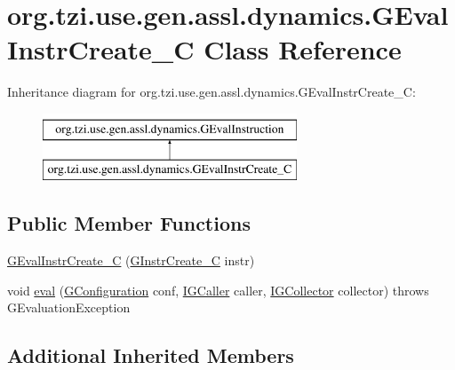\hypertarget{classorg_1_1tzi_1_1use_1_1gen_1_1assl_1_1dynamics_1_1_g_eval_instr_create___c}{\section{org.\-tzi.\-use.\-gen.\-assl.\-dynamics.\-G\-Eval\-Instr\-Create\-\_\-\-C Class Reference}
\label{classorg_1_1tzi_1_1use_1_1gen_1_1assl_1_1dynamics_1_1_g_eval_instr_create___c}
}
Inheritance diagram for org.\-tzi.\-use.\-gen.\-assl.\-dynamics.\-G\-Eval\-Instr\-Create\-\_\-\-C\-:\begin{figure}[H]
\begin{center}
\leavevmode
\includegraphics[height=2.000000cm]{classorg_1_1tzi_1_1use_1_1gen_1_1assl_1_1dynamics_1_1_g_eval_instr_create___c}
\end{center}
\end{figure}
\subsection*{Public Member Functions}
\begin{DoxyCompactItemize}
\item 
\hyperlink{classorg_1_1tzi_1_1use_1_1gen_1_1assl_1_1dynamics_1_1_g_eval_instr_create___c_a285ca86c6f3e398bc5766942c9bef664}{G\-Eval\-Instr\-Create\-\_\-\-C} (\hyperlink{classorg_1_1tzi_1_1use_1_1gen_1_1assl_1_1statics_1_1_g_instr_create___c}{G\-Instr\-Create\-\_\-\-C} instr)
\item 
void \hyperlink{classorg_1_1tzi_1_1use_1_1gen_1_1assl_1_1dynamics_1_1_g_eval_instr_create___c_a3b1eb15a89b2cb30322c82913b922c78}{eval} (\hyperlink{classorg_1_1tzi_1_1use_1_1gen_1_1assl_1_1dynamics_1_1_g_configuration}{G\-Configuration} conf, \hyperlink{interfaceorg_1_1tzi_1_1use_1_1gen_1_1assl_1_1dynamics_1_1_i_g_caller}{I\-G\-Caller} caller, \hyperlink{interfaceorg_1_1tzi_1_1use_1_1gen_1_1assl_1_1dynamics_1_1_i_g_collector}{I\-G\-Collector} collector)  throws G\-Evaluation\-Exception 
\end{DoxyCompactItemize}
\subsection*{Additional Inherited Members}


